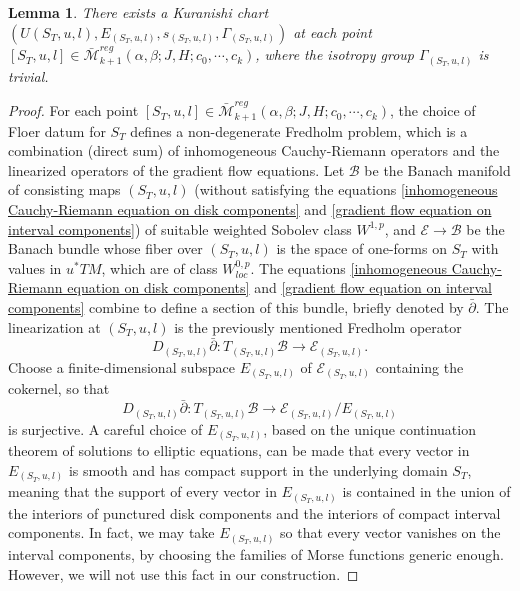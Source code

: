 \documentclass{amsart}
\newtheorem{lemma}[theorem]{Lemma}
\numberwithin{equation}{section}
\numberwithin{figure}{section}
\begin{document}
\begin{lemma}
	There exists a Kuranishi chart $(U(S_{T}, u, l), E_{(S_{T}, u, l)}, s_{(S_{T}, u, l)}, \Gamma_{(S_{T}, u, l)})$ at each point $[S_{T}, u, l] \in \bar{\mathcal{M}}_{k+1}^{reg}(\alpha, \beta; J, H; c_{0}, \cdots, c_{k})$, where the isotropy group $\Gamma_{(S_{T}, u, l)}$ is trivial.
\end{lemma}
\begin{proof}
	For each point $[S_{T}, u, l] \in \bar{\mathcal{M}}_{k+1}^{reg}(\alpha, \beta; J, H; c_{0}, \cdots, c_{k})$, the choice of Floer datum for $S_{T}$ defines a non-degenerate Fredholm problem, which is a combination (direct sum) of inhomogeneous Cauchy-Riemann operators and the linearized operators of the gradient flow equations. Let $\mathcal{B}$ be the Banach manifold of consisting maps $(S_{T}, u, l)$ (without satisfying the equations \eqref{inhomogeneous Cauchy-Riemann equation on disk components} and \eqref{gradient flow equation on interval components}) of suitable weighted Sobolev class $W^{1, p}$, and $\mathcal{E} \to \mathcal{B}$ be the Banach bundle whose fiber over $(S_{T}, u, l)$ is the space of one-forms on $S_{T}$ with values in $u^{*}TM$, which are of class $W^{0, p}_{loc}$. The equations \eqref{inhomogeneous Cauchy-Riemann equation on disk components} and \eqref{gradient flow equation on interval components} combine to define a section of this bundle, briefly denoted by $\bar{\partial}$. The linearization at $(S_{T}, u, l)$ is the previously mentioned Fredholm operator
\begin{equation}
D_{(S_{T}, u, l)}\bar{\partial}: T_{(S_{T}, u, l)}\mathcal{B} \to \mathcal{E}_{(S_{T}, u, l)}.
\end{equation}
Choose a finite-dimensional subspace $E_{(S_{T}, u, l)}$ of $\mathcal{E}_{(S_{T}, u, l)}$ containing the cokernel, so that
\begin{equation}
D_{(S_{T}, u, l)}\bar{\partial}: T_{(S_{T}, u, l)}\mathcal{B} \to \mathcal{E}_{(S_{T}, u, l)}/E_{(S_{T}, u, l)}
\end{equation}
is surjective. A careful choice of $E_{(S_{T}, u, l)}$, based on the unique continuation theorem of solutions to elliptic equations, can be made that every vector in $E_{(S_{T}, u, l)}$ is smooth and has compact support in the underlying domain $S_{T}$, meaning that the support of every vector in $E_{(S_{T}, u, l)}$ is contained in the union of the interiors of punctured disk components and the interiors of compact interval components. In fact, we may take $E_{(S_{T}, u, l)}$ so that every vector vanishes on the interval components, by choosing the families of Morse functions generic enough. However, we will not use this fact in our construction. \par

\end{proof}
\end{document}
